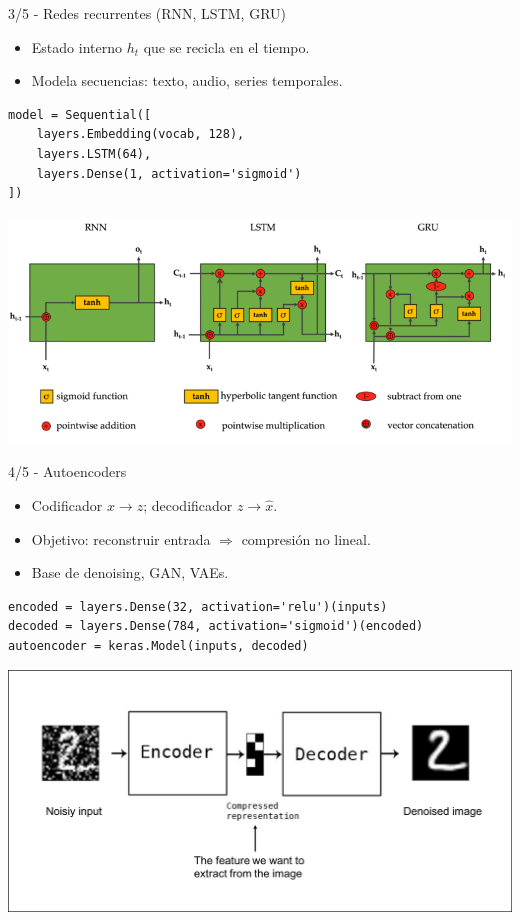 \documentclass[8pt,spanish]{beamer}
\begin{document}
\begin{frame}[fragile]{3/5  -  Redes recurrentes (RNN, LSTM, GRU)}
  \begin{itemize}
    \item Estado interno \(h_t\) que se recicla en el tiempo.
    \item Modela secuencias: texto, audio, series temporales.
  \end{itemize}
  \begin{verbatim}
model = Sequential([
    layers.Embedding(vocab, 128),
    layers.LSTM(64),
    layers.Dense(1, activation='sigmoid')
])
  \end{verbatim}
  \begin{center}
    \includegraphics[width=.75\textwidth]{rnn-lstm-gru_ex.png}
  \end{center}
\end{frame}

\begin{frame}[fragile]{4/5  -  Autoencoders}
  \begin{itemize}
    \item Codificador \(x \rightarrow z\); decodificador \(z \rightarrow \hat{x}\).
    \item Objetivo: reconstruir entrada \(\Rightarrow\) compresión no lineal.
    \item Base de denoising, GAN, VAEs.
  \end{itemize}
  \begin{verbatim}
encoded = layers.Dense(32, activation='relu')(inputs)
decoded = layers.Dense(784, activation='sigmoid')(encoded)
autoencoder = keras.Model(inputs, decoded)
  \end{verbatim}
  \begin{center}
    \includegraphics[width=.75\textwidth]{a1.png}
  \end{center}
\end{frame}
\end{document}
